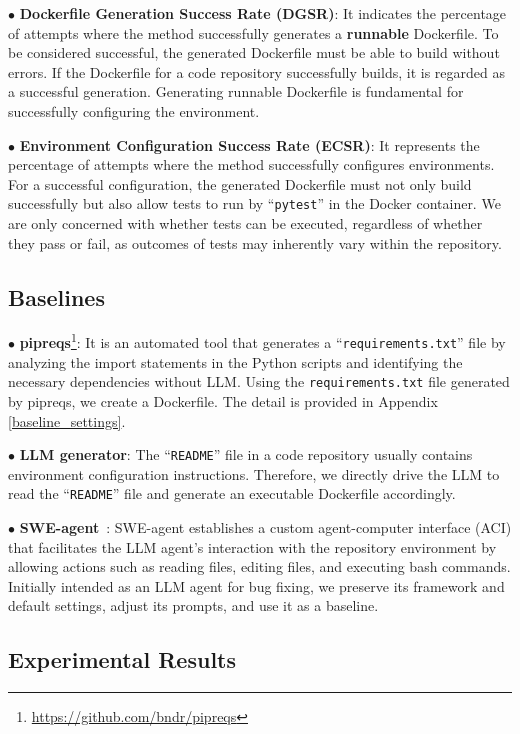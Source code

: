 $\bullet$ \textbf{Dockerfile Generation Success Rate (DGSR)}:
It indicates the percentage of attempts where the method successfully generates a \textbf{runnable} Dockerfile. To be considered successful, the generated Dockerfile must be able to build without errors. If the Dockerfile for a code repository successfully builds, it is regarded as a successful generation. Generating runnable Dockerfile is fundamental for successfully configuring the environment.


$\bullet$ \textbf{Environment Configuration Success Rate (ECSR)}:
It represents the percentage of attempts where the method successfully configures environments. For a successful configuration, the generated Dockerfile must not only build successfully but also allow tests to run by ``\texttt{pytest}'' in the Docker container. We are only concerned with whether tests can be executed, regardless of whether they pass or fail, as outcomes of tests may inherently vary within the repository.




\subsection{Baselines}


$\bullet$ \textbf{pipreqs}\footnote{\url{https://github.com/bndr/pipreqs}}: It is an automated tool that generates a ``\texttt{requirements.txt}'' file by analyzing the import statements in the Python scripts and identifying the necessary dependencies without LLM. Using the \texttt{requirements.txt} file generated by pipreqs, we create a Dockerfile. The detail is provided in Appendix \ref{baseline_settings}.


$\bullet$ \textbf{LLM generator}:
The ``\texttt{README}'' file in a code repository usually contains environment configuration instructions. Therefore, we directly drive the LLM to read the ``\texttt{README}'' file and generate an executable Dockerfile accordingly.


$\bullet$ \textbf{SWE-agent}~\cite{yang2024swe}:
SWE-agent establishes a custom agent-computer interface (ACI) that facilitates the LLM agent's interaction with the repository environment by allowing actions such as reading files, editing files, and executing bash commands. Initially intended as an LLM agent for bug fixing, we preserve its framework and default settings, adjust its prompts, and use it as a baseline.


\subsection{Experimental Results}


